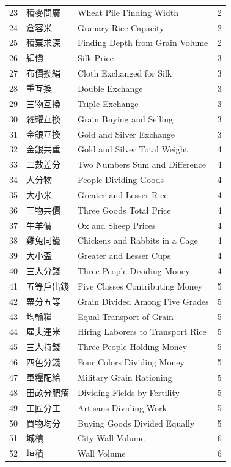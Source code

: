 \documentclass[11pt,a4paper]{article}
\begin{document}
\begin{center}
\begin{longtable}{|r|l|l|c|}
23 & 積麥問廣 & Wheat Pile Finding Width & 2 \\
24 & 倉容米 & Granary Rice Capacity & 2 \\
25 & 積粟求深 & Finding Depth from Grain Volume & 2 \\
\hline
26 & 絹價 & Silk Price & 3 \\
27 & 布價換絹 & Cloth Exchanged for Silk & 3 \\
28 & 重互換 & Double Exchange & 3 \\
29 & 三物互換 & Triple Exchange & 3 \\
30 & 糴糶互換 & Grain Buying and Selling & 3 \\
31 & 金銀互換 & Gold and Silver Exchange & 3 \\
\hline
32 & 金銀共重 & Gold and Silver Total Weight & 4 \\
33 & 二數差分 & Two Numbers Sum and Difference & 4 \\
34 & 人分物 & People Dividing Goods & 4 \\
35 & 大小米 & Greater and Lesser Rice & 4 \\
36 & 三物共價 & Three Goods Total Price & 4 \\
37 & 牛羊價 & Ox and Sheep Prices & 4 \\
38 & 雞兔同籠 & Chickens and Rabbits in a Cage & 4 \\
39 & 大小盃 & Greater and Lesser Cups & 4 \\
40 & 三人分錢 & Three People Dividing Money & 4 \\
\hline
41 & 五等戶出錢 & Five Classes Contributing Money & 5 \\
42 & 粟分五等 & Grain Divided Among Five Grades & 5 \\
43 & 均輸糧 & Equal Transport of Grain & 5 \\
44 & 雇夫運米 & Hiring Laborers to Transport Rice & 5 \\
45 & 三人持錢 & Three People Holding Money & 5 \\
46 & 四色分錢 & Four Colors Dividing Money & 5 \\
47 & 軍糧配給 & Military Grain Rationing & 5 \\
48 & 田畝分肥瘠 & Dividing Fields by Fertility & 5 \\
49 & 工匠分工 & Artisans Dividing Work & 5 \\
50 & 買物均分 & Buying Goods Divided Equally & 5 \\
\hline
51 & 城積 & City Wall Volume & 6 \\
52 & 垣積 & Wall Volume & 6 \\

\end{longtable}
\end{center}
\end{document}
